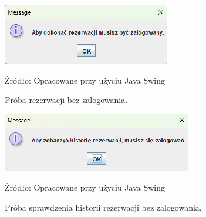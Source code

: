 \begin{figure}[H]
    \centering
    \includegraphics[width=0.8\linewidth]{figures/r6.eps}
    \caption{Próba rezerwacji bez zalogowania.}
    \label{fig:reservation_win}
    \small{Źródło: Opracowane przy użyciu Java Swing}
\end{figure}
\clearpage

\begin{figure}[H]
    \centering
    \includegraphics[width=0.8\linewidth]{figures/r7.eps}
    \caption{Próba sprawdzenia historii rezerwacji bez zalogowania.}
    \label{fig:reservation_win}
    \small{Źródło: Opracowane przy użyciu Java Swing}
\end{figure}
\clearpage




